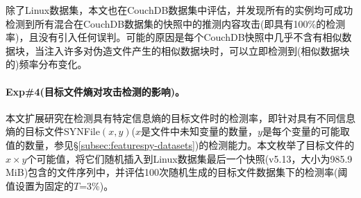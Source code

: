 除了Linux数据集，本文也在CouchDB数据集中评估\sysnameF，并发现所有\sysnameF 的实例均可成功检测到所有混合在CouchDB数据集的快照中的推测内容攻击(即具有100\%的检测率)，且没有引入任何误判。可能的原因是每个CouchDB快照中几乎不含有相似数据块，当注入许多对伪造文件产生的相似数据块时，\sysnameF 可以立即检测到(相似数据块的)频率分布变化。

\paragraph*{Exp\#4(目标文件熵对攻击检测的影响)。}

本文扩展研究\sysnameF 在检测具有特定信息熵的目标文件时的检测率，即针对具有不同信息熵的目标文件SYNFile$(x, y)$($x$是文件中未知变量的数量，$y$是每个变量的可能取值的数量，参见\S\ref{subsec:featurespy-datasets})的检测能力。本文枚举了目标文件的$x\times y$个可能值，将它们随机插入到Linux数据集最后一个快照(v5.13，大小为985.9\,MiB)包含的文件序列中，并评估100次随机生成的目标文件数据集下\sysnameF 的检测率(阈值设置为固定的$T$=3\%)。

